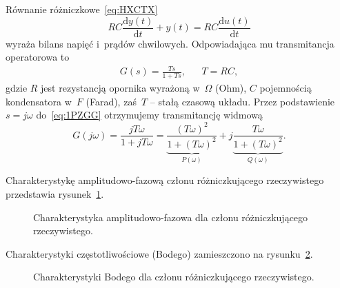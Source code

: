 \documentclass[paper=a4,DIV=12]{lpas}
\newcommand{\od}[2]{\frac{\mathrm{d}#1}{\mathrm{d}#2}}
\begin{document}
\begin{appendices}
  Równanie różniczkowe~\eqref{eq:HXCTX}
  \begin{equation}
    R C \od{y(t)}{t} + y(t) = R C \od{u(t)}{t}
    \label{eq:HXCTX}
  \end{equation}
  wyraża bilans napięć i~prądów chwilowych. Odpowiadająca mu transmitancja
  operatorowa to
  \begin{equation}
    \begin{aligned}
      &
      G(s) = \frac{Ts}{1 + Ts},
      & &
      T = R C,
      &
    \end{aligned}
    \label{eq:1PZGG}
  \end{equation}
  gdzie $R$ jest rezystancją opornika wyrażoną w~$\Omega$ (Ohm), $C$
  pojemnością kondensatora w~$F$ (Farad), zaś~$T$ -- stałą czasową układu.
  Przez podstawienie $s=j\omega$ do~\eqref{eq:1PZGG} otrzymujemy transmitancję
  widmową
  \begin{equation}
      G(j\omega)
      = \frac{jT\omega}{1 + j T\omega}
      = \underbrace{\frac{(T\omega)^2}{1 + (T\omega)^2}}_{P(\omega)}
      + j \underbrace{\frac{T\omega}{1 + (T\omega)^2}}_{Q(\omega)}.
    \label{eq:9KF4R}
  \end{equation}

  Charakterystykę amplitudowo-fazową członu różniczkującego
  rzeczywistego przedstawia rysunek~\ref{fig:4HNG2}.
  \begin{figure}[H]
    \centering
    
    \caption{Charakterystyka amplitudowo-fazowa dla członu różniczkującego rzeczywistego.}
    \label{fig:4HNG2}
  \end{figure}

  Charakterystyki częstotliwościowe (Bodego) zamieszczono na rysunku~\ref{fig:YZX1R}.
  \begin{figure}[H]
    \centering
    
    \caption{Charakterystyki Bodego dla członu różniczkującego rzeczywistego.}
    \label{fig:YZX1R}
  \end{figure}


\end{appendices}
\end{document}
